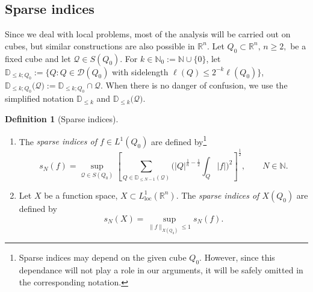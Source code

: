 \documentclass[11pt, a4paper,leqno]{amsart}
\theoremstyle{plain}
\numberwithin{equation}{section}
\theoremstyle{definition}
\newtheorem{definition}{Definition}
\theoremstyle{remark}
\def\R{\mathbb{R}}
\begin{document}
%
%


\subsection{Sparse indices\label{sec:despues}}




Since we deal with local problems, most of the analysis will be carried out on
cubes, but similar constructions are also possible in $\R^n$. Let $Q_{0} \subset \R^n, \, n \geq 2,$ be a fixed cube and let $\mathcal{Q} \in S(Q_{0}).$ For
$k\in\mathbb{N}_{0}:=\mathbb{N}\cup\{0\}$, let $\mathbb{D}_{\leq k;Q_{0}}:=\{Q:Q \in \mathcal{D}(Q_{0})$ with sidelength $\ell(Q)\leq 2^{-k}\ell(Q_{0})\}$,
$\mathbb{D}_{\leq k; Q_0}(\mathcal{Q)}:=\mathbb{D}_{\leq k;Q_{0}}\cap\mathcal{Q}$. When there is no danger of confusion,  we use the simplified notation $\mathbb{D}_{\leq k}$  and $\mathbb{D}_{\leq k}(\mathcal{Q)}$. 


\begin{definition}[Sparse indices] 
\begin{enumerate}
\item[(i)] 
The \emph{sparse indices of $f \in L^{1}(Q_{0})$} are defined by\footnote{Sparse indices may
depend on the given cube $Q_{0}.$ However, since this dependance will not play
a role in our arguments, it will be safely omitted in the corresponding notation.}
\begin{equation}\label{spinf}
s_{N}(f)= \sup_{\mathcal{Q} \in S(Q_0)} \left[\sum_{Q \in \mathbb{D}_{\leq N-1} (\mathcal{Q})}\bigg(|Q|^{\frac{1}%
{n}-\frac{1}{2}}\int_{Q}|f|\bigg)^{2}\right]^{\frac{1}{2}}, \qquad N \in \mathbb{N}.
\end{equation}
\item[(ii)] Let $X$ be a function space, $X\subset L_{\text{loc}}^{1}(\mathbb{R}^{n})$. The \emph{sparse indices of $X(Q_0)$} are defined by
\begin{equation}
 s_{N}(X) =\sup_{\|f\|_{X(Q_0)} \leq 1} s_N(f). \label{delacompa1}%
\end{equation}
\end{enumerate}
\end{definition}
\end{document}
